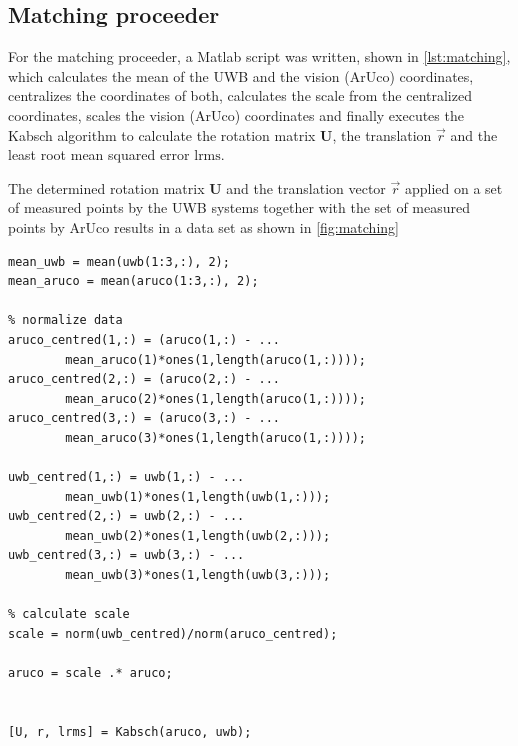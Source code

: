 \subsection{Matching proceeder}\label{subsec:matching}
For the matching proceeder, a Matlab script was written, shown in \autoref{lst:matching}, which calculates the mean of the UWB and the vision (ArUco) coordinates, centralizes the coordinates of both, calculates the scale from the centralized coordinates, scales the vision (ArUco) coordinates and finally executes the Kabsch algorithm to calculate the rotation matrix $\textbf{U}$, the translation $\vec r$ and the least root mean squared error $\text{lrms}$.

The determined rotation matrix $\textbf{U}$ and the translation vector $\vec r$ applied on a set of measured points by the UWB systems together with the set of measured points by ArUco results in a data set as shown in \autoref{fig:matching}

\lstset{language=Matlab}
\begin{lstlisting}[frame=single, caption=Matching proceeder, label=lst:matching]
% Calculate mean
mean_uwb = mean(uwb(1:3,:), 2);
mean_aruco = mean(aruco(1:3,:), 2);
	
% normalize data	
aruco_centred(1,:) = (aruco(1,:) - ...
		mean_aruco(1)*ones(1,length(aruco(1,:))));
aruco_centred(2,:) = (aruco(2,:) - ...
		mean_aruco(2)*ones(1,length(aruco(1,:))));
aruco_centred(3,:) = (aruco(3,:) - ...
		mean_aruco(3)*ones(1,length(aruco(1,:))));

uwb_centred(1,:) = uwb(1,:) - ...
		mean_uwb(1)*ones(1,length(uwb(1,:)));
uwb_centred(2,:) = uwb(2,:) - ...
		mean_uwb(2)*ones(1,length(uwb(2,:)));
uwb_centred(3,:) = uwb(3,:) - ...
		mean_uwb(3)*ones(1,length(uwb(3,:)));
	
% calculate scale
scale = norm(uwb_centred)/norm(aruco_centred);
	
aruco = scale .* aruco;
	
	
[U, r, lrms] = Kabsch(aruco, uwb);
\end{lstlisting}

